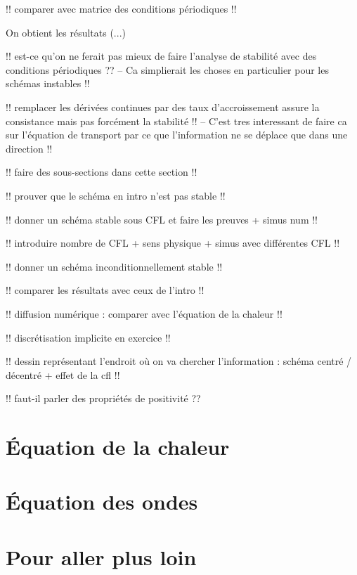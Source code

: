 \documentclass[12pt,a4paper,twoside]{article}
\begin{document}
!! comparer avec matrice des conditions p\'eriodiques !!


On obtient les r\'esultats (...)

!! est-ce qu'on ne ferait pas mieux de faire l'analyse de stabilit\'e
avec des conditions p\'eriodiques ??
-- Ca simplierait les choses en particulier pour les sch\'emas instables !!


!! remplacer les d\'eriv\'ees continues par des taux d'accroissement
assure la consistance mais pas forc\'ement la stabilit\'e !!
-- C'est tres interessant de faire ca sur l'\'equation de transport par ce que 
l'information ne se d\'eplace que dans une direction !!

!! faire des sous-sections dans cette section !!

!! prouver que le sch\'ema en intro n'est pas stable !!

!! donner un sch\'ema stable sous CFL et faire les preuves + simus num !!

!! introduire nombre de CFL + sens physique + simus avec diff\'erentes CFL !!

!! donner un sch\'ema inconditionnellement stable !!

!! comparer les r\'esultats avec ceux de l'intro !!

!! diffusion num\'erique : comparer avec l'\'equation de la chaleur !!

!! discr\'etisation implicite en exercice !!

!! dessin repr\'esentant l'endroit o\`u on va chercher l'information :
sch\'ema centr\'e / d\'ecentr\'e + effet de la cfl !!

!! faut-il parler des propri\'et\'es de positivit\'e ??

\section{\'Equation de la chaleur}

\section{\'Equation des ondes}


\section{Pour aller plus loin}
\end{document}
